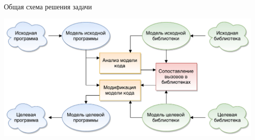 \documentclass[12pt]{beamer}
\begin{document}
\begin{frame}{Общая схема решения задачи}
\begin{center}
\includegraphics[width=\textwidth]{scheme.pdf}
\end{center}
\end{frame}

\end{document}

